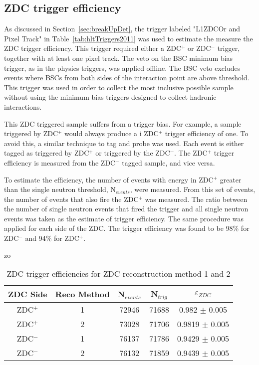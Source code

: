     \subsection{ZDC trigger efficiency}
      As discussed in Section~\ref{sec:breakUpDet}, the trigger labeled 
        "L1ZDCOr and Pixel Track" in Table~\ref{tab:hltTriggers2011} was used 
        to estimate the measure the ZDC trigger efficiency. 
      This trigger required either a ZDC$^{+}$ or ZDC$^{-}$ trigger, together with at 
        least one pixel track. 
      The veto on the BSC minimum bias trigger, as in the physics triggers, was
        applied offline.
      The BSC veto excludes events where BSCs from both sides of the 
        interaction point are above threshold. 
      This trigger was used in order to collect the most inclusive possible 
        sample without using the minimum bias triggers designed to collect 
        hadronic interactions.
        
      This ZDC triggered sample suffers from a trigger bias. 
      For example, a sample triggered by ZDC$^{+}$ would always produce a i
        ZDC$^{+}$ trigger efficiency of one. 
      To avoid this, a similar technique to tag and probe was used.
      Each event is either tagged as triggered by ZDC$^{+}$ or triggered 
        by the ZDC$^{-}$. 
      The ZDC$^{+}$ trigger efficiency is measured from the ZDC$^{-}$ tagged 
        sample, and vice versa.

      To estimate the efficiency, the number of events with energy in 
        ZDC$^{+}$ greater than the single neutron threshold, N$_{events}$, 
        were measured.
      From this set of events, the number of events that also fire the 
        ZDC$^{+}$ was measured.
      The ratio between the number of single neutron events that fired the 
        trigger and all single neutron events was taken as the estimate of 
        trigger efficiency. 
      The same procedure was applied for each side of the ZDC.
      The trigger efficiency was found to be 98\% for ZDC$^{-}$
        and 94\% for ZDC$^{+}$.

      \begin{table}zo
        \centering
        \begin{tabular}{|c|c|c|c|c|}
           ZDC Side & Reco Method & N$_{events}$ & N$_{trig}$ & $\varepsilon_{ZDC}$ \\ \hline
           ZDC$^{+}$ & 1 & 72946  & 71688 & 0.982 $\pm$ 0.005 \\ \hline
           ZDC$^{+}$ & 2 & 73028  & 71706  & 0.9819  $\pm$ 0.005  \\ \hline
           ZDC$^{-}$ & 1 & 76137  & 71786  & 0.9429  $\pm$ 0.005  \\ \hline
           ZDC$^{-}$ & 2 & 76132  & 71859  & 0.9439  $\pm$ 0.005  \\ \hline
        \end{tabular}
        \caption{ZDC trigger efficiencies for ZDC reconstruction method 1 and 
          2}
        \label{tab:zdcEfficiency}
      \end{table}


